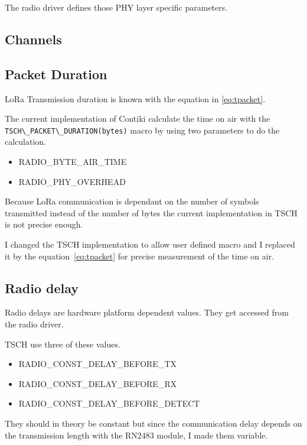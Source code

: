 The radio driver defines those PHY layer specific parameters.

\subsection{Channels}


\subsection{Packet Duration}

LoRa Transmission duration is known with the equation
in \ref{eq:tpacket}.

The current implementation of Contiki calculate the time on air with the
\lstinline{TSCH\_PACKET\_DURATION(bytes)} macro by using two parameters to do the
calculation.

\begin{itemize}
    \item RADIO\_BYTE\_AIR\_TIME
    \item RADIO\_PHY\_OVERHEAD
\end{itemize}

Because LoRa communication is dependant on the number of symbols transmitted
instead of the number of bytes the current implementation in TSCH is not
precise enough.

I changed the TSCH implementation to allow user defined macro and
I replaced it by the equation~\ref{eq:tpacket} for precise measurement
of the time on air.

\subsection{Radio delay}

Radio delays are hardware platform dependent values. 
They get accessed from the radio driver.

TSCH use three of these values.

\begin{itemize}
  \item RADIO\_CONST\_DELAY\_BEFORE\_TX
  \item RADIO\_CONST\_DELAY\_BEFORE\_RX
  \item RADIO\_CONST\_DELAY\_BEFORE\_DETECT
\end{itemize}

They should in theory be constant but since the communication delay depends
on the transmission length with the RN2483 module, I made them variable.

